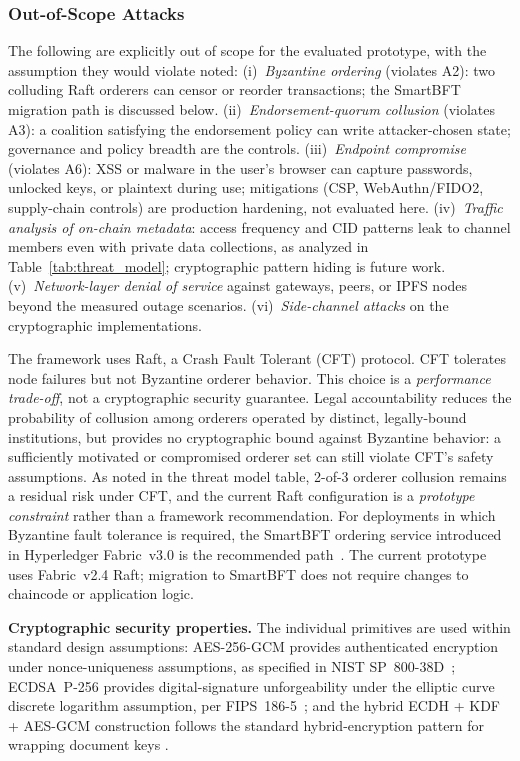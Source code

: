 \documentclass[preprint,12pt]{elsarticle}
\begin{document}
\subsubsection{Out-of-Scope Attacks}
\label{sec:out_of_scope}

The following are explicitly out of scope for the evaluated
prototype, with the assumption they would violate noted:
(i)~\emph{Byzantine ordering} (violates A2): two colluding Raft
orderers can censor or reorder transactions; the SmartBFT migration
path is discussed below. (ii)~\emph{Endorsement-quorum collusion}
(violates A3): a coalition satisfying the endorsement policy can
write attacker-chosen state; governance and policy breadth are the
controls. (iii)~\emph{Endpoint compromise} (violates A6): XSS or
malware in the user's browser can capture passwords, unlocked keys,
or plaintext during use; mitigations (CSP, WebAuthn/FIDO2,
supply-chain controls) are production hardening, not evaluated
here. (iv)~\emph{Traffic analysis of on-chain metadata}: access
frequency and CID patterns leak to channel members even with private
data collections, as analyzed in Table~\ref{tab:threat_model};
cryptographic pattern hiding is future work. (v)~\emph{Network-layer
denial of service} against gateways, peers, or IPFS nodes beyond the
measured outage scenarios. (vi)~\emph{Side-channel attacks} on the
cryptographic implementations.

The framework uses Raft, a Crash Fault
Tolerant (CFT) protocol. CFT tolerates node failures but not
Byzantine orderer behavior. This choice is a \emph{performance
trade-off}, not a cryptographic security guarantee. Legal
accountability reduces the probability of collusion among orderers
operated by distinct, legally-bound institutions, but provides no
cryptographic bound against Byzantine behavior: a sufficiently
motivated or compromised orderer set can still violate CFT's safety
assumptions. As noted in the threat model table, 2-of-3 orderer
collusion remains a residual risk under CFT, and the current Raft
configuration is a \emph{prototype constraint} rather than a
framework recommendation. For deployments in which Byzantine fault
tolerance is required, the SmartBFT ordering service introduced in
Hyperledger Fabric~v3.0 is the recommended
path~\cite{stathakopoulou2022smartbft,fabricWhatsNew3x,fabricBFTConfigurationDoc}. The current
prototype uses Fabric~v2.4 Raft; migration to SmartBFT does not
require changes to chaincode or application logic.

\textbf{Cryptographic security properties.} The individual
primitives are used within standard design assumptions: AES-256-GCM
provides authenticated encryption under nonce-uniqueness assumptions,
as specified in NIST SP~800-38D~\cite{nist80038d}; ECDSA~P-256
provides digital-signature unforgeability under the elliptic curve
discrete logarithm assumption, per FIPS~186-5~\cite{fips1865}; and
the hybrid ECDH + KDF + AES-GCM construction follows the
standard hybrid-encryption pattern for wrapping document keys
\cite{ieee1363a2004}.
\end{document}
